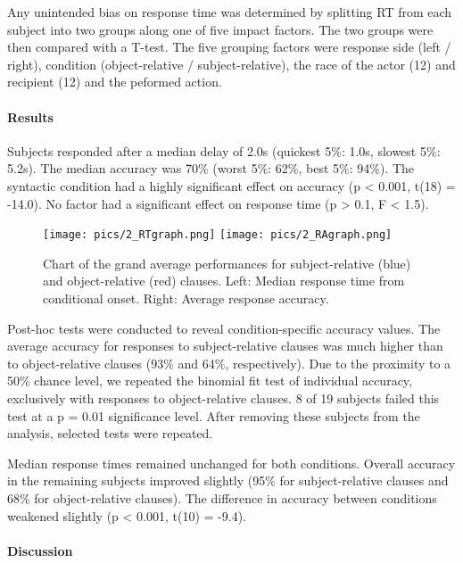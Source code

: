 Any unintended bias on response time was determined by splitting RT from each subject into two groups along one of five impact factors.
The two groups were then compared with a T-test.
The five grouping factors were response side (left / right), condition (object-relative / subject-relative), the race of the actor (12) and recipient (12) and the peformed action.

\paragraph{Results}

Subjects responded after a median delay of 2.0s (quickest 5\%: 1.0s, slowest 5\%: 5.2s).
The median accuracy was 70\% (worst 5\%: 62\%, best 5\%: 94\%).
The syntactic condition had a highly significant effect on accuracy (p < 0.001, t(18) = -14.0).
No factor had a significant effect on response time (p > 0.1, F < 1.5).

\begin{figure}[h]
\begin{center}
\texttt{[image: pics/2\_RTgraph.png]}
\texttt{[image: pics/2\_RAgraph.png]}
\caption{\label{2.RTgraph} Chart of the grand average performances for subject-relative (blue) and object-relative (red) clauses. Left: Median response time from conditional onset. Right: Average response accuracy.}
\end{center}
\end{figure}

Post-hoc tests were conducted to reveal condition-specific accuracy values.
The average accuracy for responses to subject-relative clauses was much higher than to object-relative clauses (93\% and 64\%, respectively).
Due to the proximity to a 50\% chance level, we repeated the binomial fit test of individual accuracy, exclusively with responses to object-relative clauses.
8 of 19 subjects failed this test at a p = 0.01 significance level.
After removing these subjects from the analysis, selected tests were repeated.

Median response times remained unchanged for both conditions.
Overall accuracy in the remaining subjects improved slightly (95\% for subject-relative clauses and 68\% for object-relative clauses).
The difference in accuracy between conditions weakened slightly (p < 0.001, t(10) = -9.4).


\paragraph{Discussion}

